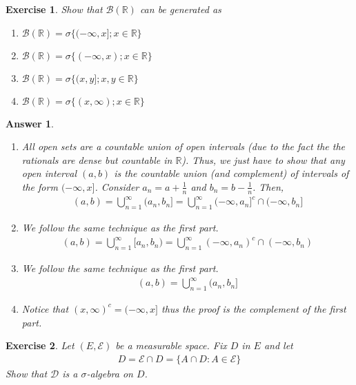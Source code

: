 \documentclass[12pt]{article}
\theoremstyle{colon}
\newtheorem{exercise}{Exercise}
\newtheorem*{answer}{Answer}
\begin{document}
\clearpage

\begin{exercise}
  Show that $\mathcal{B}(\mathbb{R})$ can be generated as
  \begin{enumerate}[label=\roman*)]
    \item $\mathcal{B}(\mathbb{R}) = \sigma\{ (-\infty,x]; x \in \mathbb{R} \}$
    \item $\mathcal{B}(\mathbb{R}) = \sigma\{ (-\infty,x); x \in \mathbb{R} \}$
    \item $\mathcal{B}(\mathbb{R}) = \sigma\{ (x,y]; x,y \in \mathbb{R} \}$
    \item $\mathcal{B}(\mathbb{R}) = \sigma\{ (x,\infty); x \in \mathbb{R} \}$
  \end{enumerate}
\end{exercise}

\begin{answer}
  \leavevmode
  \begin{enumerate}[label=\roman*)]
    \item All open sets are a countable union of open intervals (due to the fact the the rationals are dense but countable in $\mathbb{R}$). Thus, we just have to show that any open interval $(a,b)$ is the countable union (and complement) of intervals of the form $(-\infty, x]$. Consider $a_n = a + \frac{1}{n}$ and $b_n = b - \frac{1}{n}$. Then,
    \begin{gather*}
      (a,b) = \bigcup_{n=1}^\infty (a_n, b_n] = \bigcup_{n=1}^\infty (-\infty, a_n]^c \cap (-\infty, b_n]
    \end{gather*}
    \item We follow the same technique as the first part.
    \begin{gather*}
      (a,b) = \bigcup_{n=1}^\infty [a_n, b_n) = \bigcup_{n=1}^\infty (-\infty, a_n)^c \cap (-\infty, b_n)
    \end{gather*}
    \item We follow the same technique as the first part.
    \begin{gather*}
      (a,b) = \bigcup_{n=1}^\infty (a_n, b_n]
    \end{gather*}
    \item Notice that $(x,\infty)^c = (-\infty,x]$ thus the proof is the complement of the first part.
  \end{enumerate}
\end{answer}

\clearpage

\begin{exercise}
  Let $(E, \mathcal{E})$ be a measurable space. Fix $D$ in $E$ and let
  \begin{gather*}
    D = \mathcal{E} \cap D = \{ A \cap D: A \in \mathcal{E} \}
  \end{gather*}
  Show that $\mathcal{D}$ is a $\sigma$-algebra on $D$.
\end{exercise}
\end{document}
